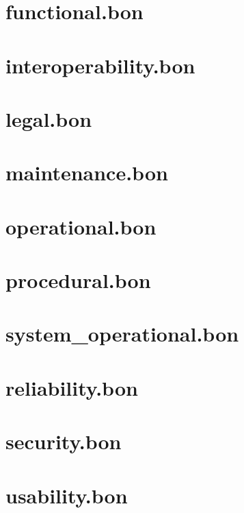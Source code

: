 \section{functional.bon}

\section{interoperability.bon}

\section{legal.bon}

\section{maintenance.bon}

\section{operational.bon}

\section{procedural.bon}

\section{system\_operational.bon}

\section{reliability.bon}

\section{security.bon}

\section{usability.bon}

